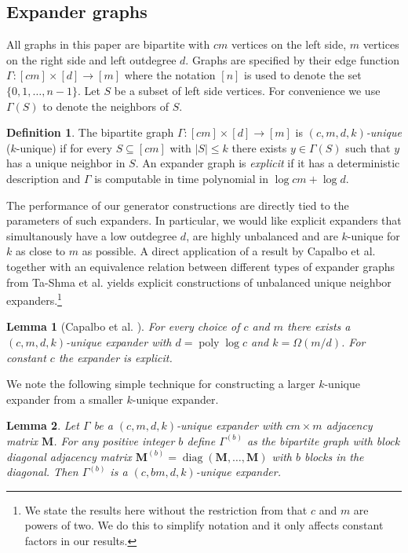 \documentclass[a4paper,11pt]{article}
\theoremstyle{plain}
\newtheorem{lemma}{Lemma}
\theoremstyle{definition}
\newtheorem{definition}{Definition}
\newcommand{\mat}[1]{\mathbf{#1}}
\DeclareMathOperator{\poly}{poly}
\DeclareMathOperator{\diag}{diag}
\begin{document}
\subsection{Expander graphs}
All graphs in this paper are bipartite with $cm$ vertices on the left side, $m$ vertices on the right side and left outdegree $d$.
Graphs are specified by their edge function $\Gamma : [cm] \times [d] \to [m]$ where the notation $[n]$ is used to denote the set $\{0,1,\dots,n-1\}$.
Let $S$ be a subset of left side vertices. 
For convenience we use $\Gamma(S)$ to denote the neighbors of $S$. 
\begin{definition}
The bipartite graph $\Gamma : [cm] \times [d] \to [m]$ is \mbox{\emph{$(c,m,d,k)$-unique}} ($k$-unique) 
if for every $S \subseteq [cm]$ with $|S| \leq k$ there exists $y \in \Gamma(S)$ such that $y$ has a unique neighbor in $S$. 
An expander graph is \emph{explicit} if it has a deterministic description and $\Gamma$ is computable in time polynomial in $\log cm + \log d$. 
\end{definition}
The performance of our generator constructions are directly tied to the parameters of such expanders. 
In particular, we would like explicit expanders that simultanously have a low outdegree $d$, are highly unbalanced and are $k$-unique for $k$ as close to $m$ as possible.
A direct application of a result by Capalbo et al. \cite[Theorem 7.1]{capalbo2002} together with an equivalence relation between different types of expander graphs from Ta-Shma et al. \cite[Theorem 8.1]{tashma2007} yields explicit constructions of unbalanced unique neighbor expanders.\footnote{We state the results here without the restriction from \cite{capalbo2002} that $c$ and $m$ are powers of two. We do this to simplify notation and it only affects constant factors in our results.}  
\begin{lemma}[Capalbo et al. {\cite[Theorem 7.1]{capalbo2002}}] \label{lem:explicit}
For every choice of $c$ and $m$ there exists a $(c,m,d,k)$-unique expander with $d = \poly \log c$ and $k = \Omega(m/d)$. For constant $c$ the expander is explicit. 
\end{lemma}
We note the following simple technique for constructing a larger $k$-unique expander from a smaller $k$-unique expander.
\begin{lemma} \label{lem:stacking}
Let $\Gamma$ be a $(c,m,d,k)$-unique expander with $cm \times m$ adjacency matrix $\mat{M}$.
For any positive integer $b$ define $\Gamma^{(b)}$ as the bipartite graph with block diagonal adjacency matrix $\mat{M}^{(b)} = \diag(\mat{M}, \dots, \mat{M})$ with $b$ blocks in the diagonal.
Then $\Gamma^{(b)}$ is a $(c, bm, d, k)$-unique expander.
\end{lemma}
\end{document}
